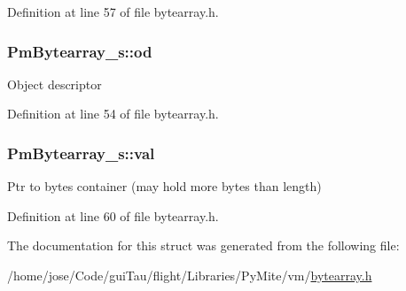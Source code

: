 Definition at line 57 of file bytearray.\-h.

\hypertarget{struct_pm_bytearray__s_ac30a5f7ed0f5b86d794054363462013e}{
\subsubsection[{od}]{ Pm\-Bytearray\-\_\-s\-::od}}\label{struct_pm_bytearray__s_ac30a5f7ed0f5b86d794054363462013e}
Object descriptor 

Definition at line 54 of file bytearray.\-h.

\hypertarget{struct_pm_bytearray__s_a050a072fa01f5a42c5f25e2d1ff54fe5}{
\subsubsection[{val}]{ Pm\-Bytearray\-\_\-s\-::val}}\label{struct_pm_bytearray__s_a050a072fa01f5a42c5f25e2d1ff54fe5}
Ptr to bytes container (may hold more bytes than length) 

Definition at line 60 of file bytearray.\-h.



The documentation for this struct was generated from the following file\-:\begin{DoxyCompactItemize}
\item 
/home/jose/\-Code/gui\-Tau/flight/\-Libraries/\-Py\-Mite/vm/\hyperlink{bytearray_8h}{bytearray.\-h}\end{DoxyCompactItemize}
